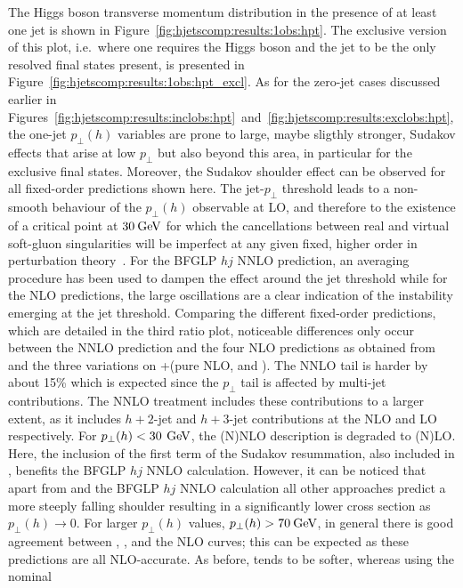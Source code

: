 The Higgs boson transverse momentum distribution in the presence of at
least one jet is shown in
Figure~\ref{fig:hjetscomp:results:1obs:hpt}. The exclusive version of
this plot, i.e.~where one requires the Higgs boson and the jet to be 
the only resolved final states present,
is presented in Figure~\ref{fig:hjetscomp:results:1obs:hpt_excl}.  As
for the zero-jet cases discussed earlier in
Figures~\ref{fig:hjetscomp:results:inclobs:hpt}~and~\ref{fig:hjetscomp:results:exclobs:hpt},
the one-jet $p_\perp(h)$ variables are prone to large, maybe sligthly
stronger, Sudakov effects that arise at low $p_\perp$ but also beyond
this area, in particular for the exclusive final states. Moreover, the
Sudakov shoulder effect can be observed for all fixed-order
predictions shown here. The jet-$p_\perp$ threshold leads to a
non-smooth behaviour of the $p_\perp(h)$ observable at LO, and
therefore to the existence of a critical point at $30\text{\:GeV}$ for which
the cancellations between real and virtual soft-gluon singularities
will be imperfect at any given fixed, higher order in perturbation
theory~\cite{Catani:1997xc}. For the BFGLP $hj$ NNLO  prediction, an
averaging procedure has been used to dampen the effect around the jet
threshold while for the NLO predictions, the large oscillations are a
clear indication of the instability emerging at the jet threshold.
Comparing the different fixed-order predictions, which are detailed in 
the third ratio plot, noticeable differences only
occur between the NNLO prediction and the four NLO predictions as
obtained from \Powheg and the three variations on \GoSam{}+\Sherpa (pure
NLO, \Minlo and \Loopsim). The NNLO tail is harder by about 15\% which
is expected since the $p_\perp$ tail is affected by multi-jet
contributions. The NNLO treatment includes these contributions to a
larger extent, as it includes $h+2$-jet and
$h+3$-jet contributions at the NLO and LO respectively. For $p_\perp(h)< 30\,\text{\:GeV}$, 
the (N)NLO description is degraded to (N)LO. Here, the inclusion of 
the first term of the Sudakov resummation, also included in \Powheg, benefits 
the BFGLP $hj$ NNLO calculation. However, it
can be noticed that apart from \Powheg and the BFGLP $hj$ NNLO
calculation all other approaches predict a more steeply falling
shoulder resulting in a significantly lower
cross section as $p_\perp(h)\to0$.
For larger $p_\perp(h)$ values, $p_\perp(h)>70\text{\:GeV}$, in general there
is good agreement between \Powheg, \MGaMC, \Sherpa and the NLO curves;
this can be expected as these predictions are all NLO-accurate. As
before, \Herwig tends to be softer, whereas \MGaMC using the nominal
